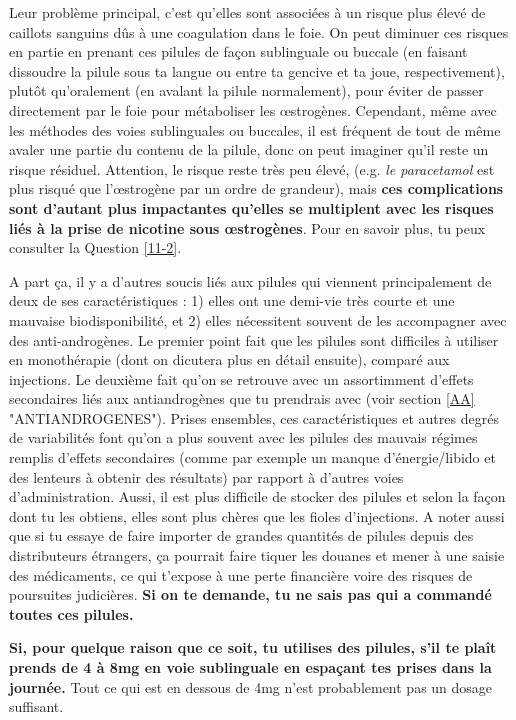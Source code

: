 \documentclass{article}
\begin{document}
Leur problème principal, c'est qu'elles sont associées à un risque plus élevé de caillots sanguins dûs à une coagulation dans le foie. On peut diminuer ces risques en partie en prenant ces pilules de façon sublinguale ou buccale (en faisant dissoudre la pilule sous ta langue ou entre ta gencive et ta joue, respectivement), plutôt qu'oralement (en avalant la pilule normalement), pour éviter de passer directement par le foie pour métaboliser les œstrogènes. Cependant, même avec les méthodes des voies sublinguales ou buccales, il est fréquent de tout de même avaler une partie du contenu de la pilule, donc on peut imaginer qu'il reste un risque résiduel. Attention, le risque reste très peu élevé, (e.g. \textit{le paracetamol} est plus risqué que l'œstrogène par un ordre de grandeur), mais \textbf{ces complications sont d'autant plus impactantes qu'elles se multiplent avec les risques liés à la prise de nicotine sous œstrogènes}. Pour en savoir plus, tu peux consulter la Question \ref{11-2}. 

A part ça, il y a d'autres soucis liés aux pilules qui viennent principalement de deux de ses caractéristiques : 1) elles ont une demi-vie très courte et une mauvaise biodisponibilité, et 2) elles nécessitent souvent de les accompagner avec des anti-androgènes. Le premier point fait que les pilules sont difficiles à utiliser en monothérapie (dont on dicutera plus en détail ensuite), comparé aux injections. Le deuxième fait qu'on se retrouve avec un assortimment d'effets secondaires liés aux antiandrogènes que tu prendrais avec (voir section \ref{AA} "ANTIANDROGENES"). Prises ensembles, ces caractéristiques et autres degrés de variabilités font qu'on a plus souvent avec les pilules des mauvais régimes remplis d'effets secondaires (comme par exemple un manque d'énergie/libido et des lenteurs à obtenir des résultats) par rapport à d'autres voies d'administration. Aussi, il est plus difficile de stocker des pilules et selon la façon dont tu les obtiens, elles sont plus chères que les fioles d'injections. A noter aussi que si tu essaye de faire importer de grandes quantités de pilules depuis des distributeurs étrangers, ça pourrait faire tiquer les douanes et mener à une saisie des médicaments, ce qui t'expose à une perte financière voire des risques de poursuites judicières. \textbf{Si on te demande, tu ne sais pas qui a commandé toutes ces pilules.}

\textbf{Si, pour quelque raison que ce soit, tu utilises des pilules, s'il te plaît prends de 4 à 8mg en voie sublinguale en espaçant tes prises dans la journée.} Tout ce qui est en dessous de 4mg n'est probablement pas un dosage suffisant.
\end{document}

